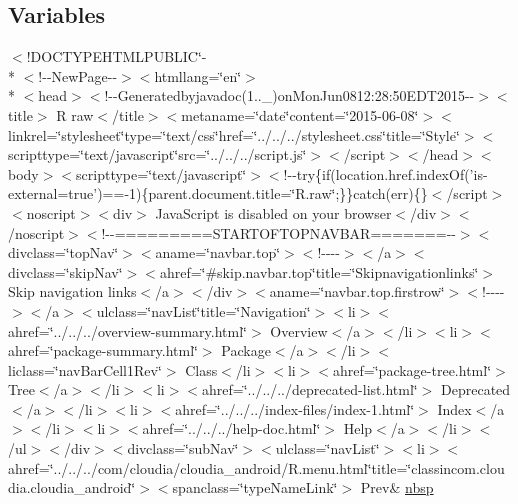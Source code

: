 \subsection*{Variables}
\begin{DoxyCompactItemize}
\item 
$<$!D\-O\-C\-T\-Y\-P\-E\-H\-T\-M\-L\-P\-U\-B\-L\-I\-C\char`\"{}-\/\\*
$<$!-\/-\/New\-Page-\/-\/$>$$<$htmllang=\char`\"{}en\char`\"{}$>$\\*
$<$head$>$$<$!-\/-\/Generatedbyjavadoc(1..\-\_)on\-Mon\-Jun0812\-:28\-:50\-E\-D\-T2015-\/-\/$>$$<$title$>$ R raw$<$/title$>$$<$metaname=\char`\"{}date\char`\"{}content=\char`\"{}2015-\/06-\/08\char`\"{}$>$$<$linkrel=\char`\"{}stylesheet\char`\"{}type=\char`\"{}text/css\char`\"{}href=\char`\"{}../../../stylesheet.\-css\char`\"{}title=\char`\"{}\-Style\char`\"{}$>$$<$scripttype=\char`\"{}text/javascript\char`\"{}src=\char`\"{}../../../script.\-js\char`\"{}$>$$<$/script$>$$<$/head$>$$<$body$>$$<$scripttype=\char`\"{}text/javascript\char`\"{}$>$$<$!-\/-\/try\{if(location.\-href.\-index\-Of('is-\/external=true')==-\/1)\{parent.\-document.\-title=\char`\"{}\-R.\-raw\char`\"{};\}\}catch(err)\{\}$<$/script$>$$<$noscript$>$$<$div$>$ Java\-Script is disabled on your browser$<$/div$>$$<$/noscript$>$$<$!-\/-\/=========\-S\-T\-A\-R\-T\-O\-F\-T\-O\-P\-N\-A\-V\-B\-A\-R=======-\/-\/$>$$<$divclass=\char`\"{}top\-Nav\char`\"{}$>$$<$aname=\char`\"{}navbar.\-top\char`\"{}$>$$<$!-\/-\/-\/-\/$>$$<$/a$>$$<$divclass=\char`\"{}skip\-Nav\char`\"{}$>$$<$ahref=\char`\"{}\#skip.\-navbar.\-top\char`\"{}title=\char`\"{}\-Skipnavigationlinks\char`\"{}$>$ Skip navigation links$<$/a$>$$<$/div$>$$<$aname=\char`\"{}navbar.\-top.\-firstrow\char`\"{}$>$$<$!-\/-\/-\/-\/$>$$<$/a$>$$<$ulclass=\char`\"{}nav\-List\char`\"{}title=\char`\"{}\-Navigation\char`\"{}$>$$<$li$>$$<$ahref=\char`\"{}../../../overview-\/summary.\-html\char`\"{}$>$ Overview$<$/a$>$$<$/li$>$$<$li$>$$<$ahref=\char`\"{}package-\/summary.\-html\char`\"{}$>$ Package$<$/a$>$$<$/li$>$$<$liclass=\char`\"{}nav\-Bar\-Cell1\-Rev\char`\"{}$>$ Class$<$/li$>$$<$li$>$$<$ahref=\char`\"{}package-\/tree.\-html\char`\"{}$>$ Tree$<$/a$>$$<$/li$>$$<$li$>$$<$ahref=\char`\"{}../../../deprecated-\/list.\-html\char`\"{}$>$ Deprecated$<$/a$>$$<$/li$>$$<$li$>$$<$ahref=\char`\"{}../../../index-\/files/index-\/1.\-html\char`\"{}$>$ Index$<$/a$>$$<$/li$>$$<$li$>$$<$ahref=\char`\"{}../../../help-\/doc.\-html\char`\"{}$>$ Help$<$/a$>$$<$/li$>$$<$/ul$>$$<$/div$>$$<$divclass=\char`\"{}sub\-Nav\char`\"{}$>$$<$ulclass=\char`\"{}nav\-List\char`\"{}$>$$<$li$>$$<$ahref=\char`\"{}../../../com/cloudia/cloudia\-\_\-android/\-R.\-menu.\-html\char`\"{}title=\char`\"{}classincom.\-cloudia.\-cloudia\-\_\-android\char`\"{}$>$$<$spanclass=\char`\"{}type\-Name\-Link\char`\"{}$>$ Prev\& \hyperlink{_r_8raw_8html_aef915316f784c9063d942974538301a6}{nbsp}

\end{DoxyCompactItemize}
